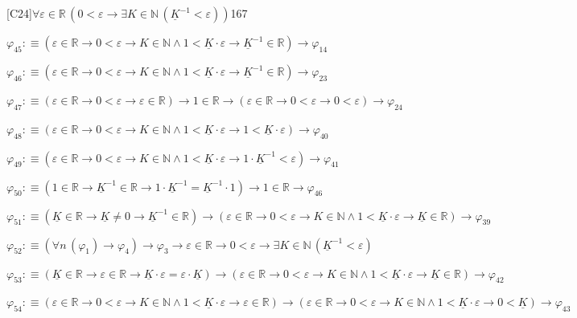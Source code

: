 \begin{fullproof}{[C24]}{$\forall \varepsilon \in \mathbb{R}\,(0 < \varepsilon \to \exists K \in \mathbb{N}\,(\underline{K}^{-1} < \varepsilon))$}{167}
\begin{abbrevlist}
\item $\varphi_{45} :\equiv (\varepsilon \in \mathbb{R} \to 0 < \varepsilon \to K \in \mathbb{N} \land 1 < \underline{K} \cdot \varepsilon \to \underline{K}^{-1} \in \mathbb{R}) \to \varphi_{14}$
\item $\varphi_{46} :\equiv (\varepsilon \in \mathbb{R} \to 0 < \varepsilon \to K \in \mathbb{N} \land 1 < \underline{K} \cdot \varepsilon \to \underline{K}^{-1} \in \mathbb{R}) \to \varphi_{23}$
\item $\varphi_{47} :\equiv (\varepsilon \in \mathbb{R} \to 0 < \varepsilon \to \varepsilon \in \mathbb{R}) \to 1 \in \mathbb{R} \to (\varepsilon \in \mathbb{R} \to 0 < \varepsilon \to 0 < \varepsilon) \to \varphi_{24}$
\item $\varphi_{48} :\equiv (\varepsilon \in \mathbb{R} \to 0 < \varepsilon \to K \in \mathbb{N} \land 1 < \underline{K} \cdot \varepsilon \to 1 < \underline{K} \cdot \varepsilon) \to \varphi_{40}$
\item $\varphi_{49} :\equiv (\varepsilon \in \mathbb{R} \to 0 < \varepsilon \to K \in \mathbb{N} \land 1 < \underline{K} \cdot \varepsilon \to 1 \cdot \underline{K}^{-1} < \varepsilon) \to \varphi_{41}$
\item $\varphi_{50} :\equiv (1 \in \mathbb{R} \to \underline{K}^{-1} \in \mathbb{R} \to 1 \cdot \underline{K}^{-1} = \underline{K}^{-1} \cdot 1) \to 1 \in \mathbb{R} \to \varphi_{46}$
\item $\varphi_{51} :\equiv (\underline{K} \in \mathbb{R} \to \underline{K} \neq 0 \to \underline{K}^{-1} \in \mathbb{R}) \to (\varepsilon \in \mathbb{R} \to 0 < \varepsilon \to K \in \mathbb{N} \land 1 < \underline{K} \cdot \varepsilon \to \underline{K} \in \mathbb{R}) \to \varphi_{39}$
\item $\varphi_{52} :\equiv (\forall n\,(\varphi_{1}) \to \varphi_{4}) \to \varphi_{3} \to \varepsilon \in \mathbb{R} \to 0 < \varepsilon \to \exists K \in \mathbb{N}\,(\underline{K}^{-1} < \varepsilon)$
\item $\varphi_{53} :\equiv (\underline{K} \in \mathbb{R} \to \varepsilon \in \mathbb{R} \to \underline{K} \cdot \varepsilon = \varepsilon \cdot \underline{K}) \to (\varepsilon \in \mathbb{R} \to 0 < \varepsilon \to K \in \mathbb{N} \land 1 < \underline{K} \cdot \varepsilon \to \underline{K} \in \mathbb{R}) \to \varphi_{42}$
\item $\varphi_{54} :\equiv (\varepsilon \in \mathbb{R} \to 0 < \varepsilon \to K \in \mathbb{N} \land 1 < \underline{K} \cdot \varepsilon \to \varepsilon \in \mathbb{R}) \to (\varepsilon \in \mathbb{R} \to 0 < \varepsilon \to K \in \mathbb{N} \land 1 < \underline{K} \cdot \varepsilon \to 0 < \underline{K}) \to \varphi_{43}$

\end{abbrevlist}
\end{fullproof}
